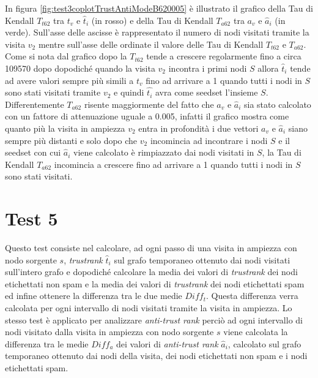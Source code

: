 In figura \ref{fig:test3coplotTrustAntiModeB620005} è illustrato il grafico della Tau di Kendall \(T_{t62}\) tra \(t_v\) e \(\hat{t}_i\) (in rosso)  e della Tau di Kendall \(T_{a62}\) tra \(a_v\) e \(\hat{a}_i\) (in verde). Sull'asse delle ascisse è rappresentato il numero di nodi visitati tramite la visita \(v_2\) mentre sull'asse delle ordinate il valore delle Tau di Kendall \(T_{t62}\) e \(T_{a62}\). Come si nota dal grafico dopo la \(T_{t62}\) tende a crescere regolarmente fino a circa 109570 dopo dopodiché quando la visita \(v_2\) incontra i primi nodi \(S\) allora \(\hat{t}_i\) tende ad avere valori sempre più simili a \(t_v\) fino ad arrivare a 1 quando tutti i nodi in \(S\) sono stati visitati tramite \(v_2\) e quindi \(\hat{t_i}\) avra come seedset l'insieme \(S\). Differentemente \(T_{a62}\) risente maggiormente del fatto che \(a_v\) e \(\hat{a}_i\) sia stato calcolato con un fattore di attenuazione uguale a 0.005, infatti il grafico mostra come quanto più la visita in ampiezza \(v_2\) entra in 
profondità i due vettori \(a_v\) e \(\hat{a}_i\) siano sempre più distanti e solo dopo che \(v_2\) incomincia ad incontrare i nodi \(S\) e il seedset con cui \(\hat{a}_i\) viene calcolato è rimpiazzato dai nodi visitati in \(S\), la Tau di Kendall \(T_{a62}\) incomincia a crescere fino ad arrivare a 1 quando tutti i nodi  in \(S\) sono stati visitati.


\section{Test 5}
Questo test consiste nel calcolare, ad ogni passo di una visita in ampiezza  con nodo sorgente \(s\), \textit{trustrank} \(\hat{t}_i\) sul grafo temporaneo ottenuto dai nodi visitati sull'intero grafo e dopodiché calcolare la media dei valori di \textit{trustrank} dei nodi etichettati non spam e la media dei valori di \textit{trustrank} dei nodi etichettati spam ed infine ottenere la differenza tra le due medie \(Diff_t\). Questa differenza verra calcolata per ogni intervallo di nodi visitati tramite la visita in ampiezza. Lo stesso test è applicato per analizzare \textit{anti-trust rank} perciò ad ogni intervallo di nodi visitato  dalla visita in ampiezza con nodo sorgente \(s\) viene calcolata la differenza tra le medie \(Diff_a\) dei valori di \textit{anti-trust rank}  \(\hat{a}_i\), calcolato sul grafo temporaneo ottenuto dai nodi della visita, dei nodi etichettati non spam e i nodi etichettati spam.

